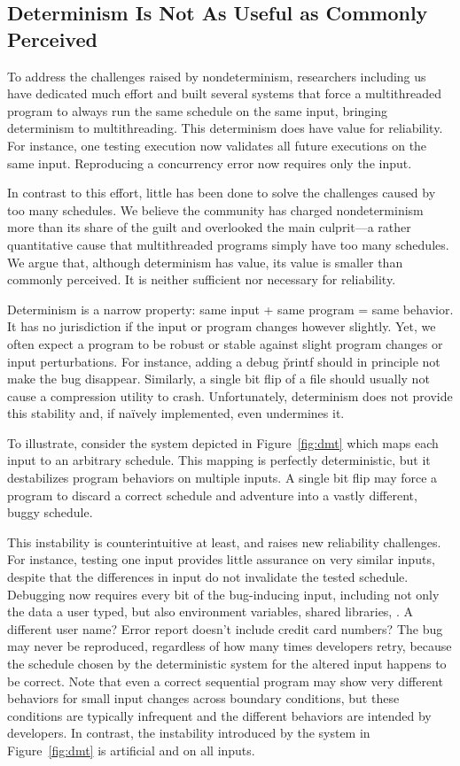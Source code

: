 \subsection{Determinism Is Not As Useful as Commonly Perceived}

To address the challenges raised by nondeterminism, researchers including
us have dedicated much effort and built several systems that force a
multithreaded program to always run the same schedule on the same input,
bringing determinism to multithreading.  This determinism does have value
for reliability.  For instance, one testing execution now validates all
future executions on the same input.  Reproducing a concurrency error now
requires only the input.

In contrast to this effort, little has been done to solve the
challenges caused by too many schedules.  We believe
the community has charged nondeterminism more than its share of the guilt
and overlooked the main culprit---a rather quantitative cause that
multithreaded programs simply have too many schedules.
We argue that, although determinism has value, its value
is smaller than commonly perceived.  It is neither sufficient nor
necessary for reliability.

 Determinism is a
narrow property: same input + same program = same behavior. It has no
jurisdiction if the input or program changes however slightly.  Yet, we
often expect a program to be robust or stable against slight program
changes or input perturbations.  For instance, adding a debug \v{printf}
should in principle not make the bug
disappear.  Similarly, a single bit flip of a file should usually not
cause a compression utility to crash. Unfortunately, determinism
does not provide this stability and, if na\"{i}vely implemented,
even undermines it.

To illustrate, consider the system depicted in
Figure~\ref{fig:dmt} which maps each input to an arbitrary schedule. This
mapping is perfectly deterministic, but it destabilizes program
behaviors on multiple inputs.  A single bit flip may force a program to
discard a correct schedule and adventure into a vastly different, buggy
schedule.

This instability is counterintuitive at least,
and raises new reliability challenges.  For instance, testing one input
provides little assurance on very similar inputs, despite that the differences
in input do not invalidate the tested schedule.  Debugging now requires
every bit of the bug-inducing input, including not only the data a user
typed, but also environment variables, shared libraries, \etc.  A
different user name?  Error report doesn't include credit card numbers?
The bug may never be reproduced, regardless of how many times developers
retry, because the schedule chosen by the deterministic system for the
altered input happens to be correct.  Note that even a correct
sequential program may show very different behaviors for small input
changes across boundary conditions, but these conditions are typically
infrequent and the different behaviors are intended by developers.  In
contrast, the instability introduced by the system in Figure~\ref{fig:dmt}
is artificial and on all inputs.

